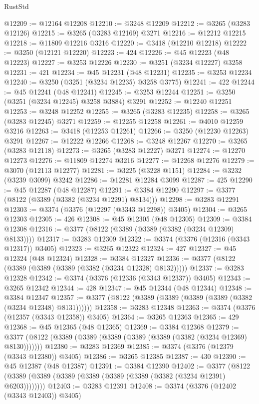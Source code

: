 \begin{lexlean}{RustStd}
\begin{coremodule}
@12209 := @12164 @12208
@12210 := @3248 @12209
@12212 := @3265 (@3283 @12126)
@12215 := @3265 (@3283 @12169) @3271
@12216 := @12212 @12215
@12218 := @11809 @12216 @3216
@12220 := @3418 (@12210 @12218)
@12222 := @3250 (@12121 @12220)
@12223 := 424
@12226 := @45 @12223 (@48 @12223)
@12227 := @3253 @12226
@12230 := @3251 (@3234 @12227) @3258
@12231 := 421
@12234 := @45 @12231 (@48 @12231)
@12235 := @3253 @12234
@12240 := @3250 (@3251 (@3234 @12235) @3258 @3775)
@12241 := 422
@12244 := @45 @12241 (@48 @12241)
@12245 := @3253 @12244
@12251 := @3250 (@3251 (@3234 @12245) @3258 @3884) @3291
@12252 := @12240 @12251
@12253 := @3248 @12252
@12255 := @3265 (@3283 @12235)
@12258 := @3265 (@3283 @12245) @3271
@12259 := @12255 @12258
@12261 := @4010 @12259 @3216
@12263 := @3418 (@12253 @12261)
@12266 := @3250 (@12230 @12263) @3291
@12267 := @12222 @12266
@12268 := @3248 @12267
@12270 := @3265 (@3283 @12118)
@12273 := @3265 (@3283 @12227) @3271
@12274 := @12270 @12273
@12276 := @11809 @12274 @3216
@12277 := @12268 @12276
@12279 := @3070 (@12113 @12277)
@12281 := @3225 (@3228 @1151)
@12284 := @3232 (@3239 @3099) @3242
@12286 := @12281 @12284 @3099
@12287 := 425
@12290 := @45 @12287 (@48 @12287)
@12291 := @3384 @12290
@12297 := @3377 (@8122 (@3389 (@3382 (@3234 @12291) @8134)))
@12298 := @3283 @12291
@12303 := @3374 (@3376 (@12297 (@3343 @12298)) @3405)
@12304 := @3265 @12303
@12305 := 426
@12308 := @45 @12305 (@48 @12305)
@12309 := @3384 @12308
@12316 := @3377 (@8122 (@3389 (@3389 (@3382 (@3234 @12309) @8133))))
@12317 := @3283 @12309
@12322 := @3374 (@3376 (@12316 (@3343 @12317)) @3405)
@12323 := @3265 @12322
@12324 := 427
@12327 := @45 @12324 (@48 @12324)
@12328 := @3384 @12327
@12336 := @3377 (@8122 (@3389 (@3389 (@3389 (@3382 (@3234 @12328) @8132)))))
@12337 := @3283 @12328
@12342 := @3374 (@3376 (@12336 (@3343 @12337)) @3405)
@12343 := @3265 @12342
@12344 := 428
@12347 := @45 @12344 (@48 @12344)
@12348 := @3384 @12347
@12357 := @3377 (@8122 (@3389 (@3389 (@3389 (@3389 (@3382 (@3234 @12348) @8131))))))
@12358 := @3283 @12348
@12363 := @3374 (@3376 (@12357 (@3343 @12358)) @3405)
@12364 := @3265 @12363
@12365 := 429
@12368 := @45 @12365 (@48 @12365)
@12369 := @3384 @12368
@12379 := @3377 (@8122 (@3389 (@3389 (@3389 (@3389 (@3389 (@3382 (@3234 @12369) @8130)))))))
@12380 := @3283 @12369
@12385 := @3374 (@3376 (@12379 (@3343 @12380)) @3405)
@12386 := @3265 @12385
@12387 := 430
@12390 := @45 @12387 (@48 @12387)
@12391 := @3384 @12390
@12402 := @3377 (@8122 (@3389 (@3389 (@3389 (@3389 (@3389 (@3389 (@3382 (@3234 @12391) @6203))))))))
@12403 := @3283 @12391
@12408 := @3374 (@3376 (@12402 (@3343 @12403)) @3405)

\end{coremodule}
\end{lexlean}
